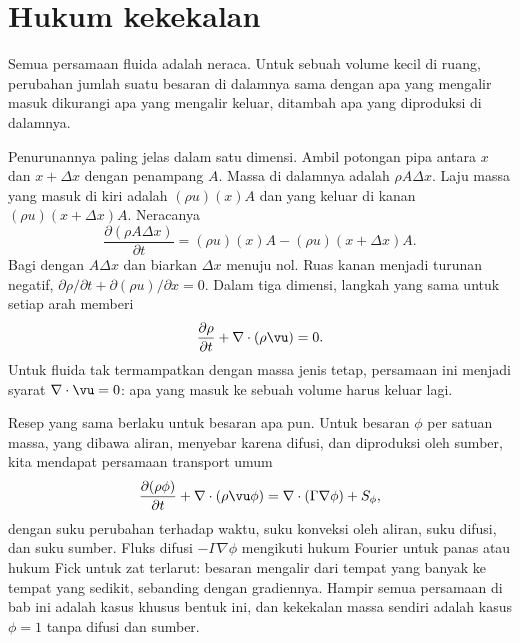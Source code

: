 \section{Hukum kekekalan}

Semua persamaan fluida adalah neraca. Untuk sebuah volume kecil di ruang, perubahan jumlah suatu
besaran di dalamnya sama dengan apa yang mengalir masuk dikurangi apa yang mengalir keluar,
ditambah apa yang diproduksi di dalamnya.

Penurunannya paling jelas dalam satu dimensi. Ambil potongan pipa antara $x$ dan $x+\Delta x$ dengan
penampang $A$. Massa di dalamnya adalah $\rho A\Delta x$. Laju massa yang masuk di kiri adalah
$(\rho u)(x)A$ dan yang keluar di kanan $(\rho u)(x+\Delta x)A$. Neracanya
\begin{equation}
\frac{\partial(\rho A\Delta x)}{\partial t}=(\rho u)(x)A-(\rho u)(x+\Delta x)A .
\end{equation}
Bagi dengan $A\Delta x$ dan biarkan $\Delta x$ menuju nol. Ruas kanan menjadi turunan negatif,
$\partial\rho/\partial t+\partial(\rho u)/\partial x=0$. Dalam tiga dimensi, langkah yang sama untuk setiap
arah memberi
\begin{equation}
\frac{\partial\rho}{\partial t}+\nabla\cdot(\rho\vu)=0.
\end{equation}
Untuk fluida tak termampatkan dengan massa jenis tetap, persamaan ini menjadi syarat
$\nabla\cdot\vu=0$: apa yang masuk ke sebuah volume harus keluar lagi.

Resep yang sama berlaku untuk besaran apa pun. Untuk besaran $\phi$ per satuan massa, yang dibawa aliran,
menyebar karena difusi, dan diproduksi oleh sumber, kita mendapat persamaan transport umum
\begin{equation}
\frac{\partial(\rho\phi)}{\partial t}+\nabla\cdot(\rho\vu\phi)=\nabla\cdot(\Gamma\nabla\phi)+S_\phi,
\label{eq:transport}
\end{equation}
dengan suku perubahan terhadap waktu, suku konveksi oleh aliran, suku difusi, dan suku sumber. Fluks
difusi $-\Gamma\nabla\phi$ mengikuti hukum Fourier untuk panas atau hukum Fick untuk zat terlarut: besaran
mengalir dari tempat yang banyak ke tempat yang sedikit, sebanding dengan gradiennya. Hampir semua
persamaan di bab ini adalah kasus khusus bentuk ini, dan kekekalan massa sendiri adalah kasus $\phi=1$
tanpa difusi dan sumber.

